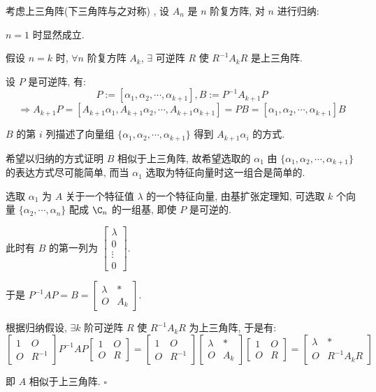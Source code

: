 \documentclass[UTF8]{ctexart}
\DeclareMathOperator{\0}{\mathbf{0}}
\DeclareMathOperator{\<}{\langle}
\renewcommand{\>}{\rangle}
\begin{document}
		\begin{prf} 
		
			考虑上三角阵(下三角阵与之对称) , 设 \(A_n\) 是 \(n\) 阶复方阵, 对 \(n\) 进行归纳: 

			 \(n=1\) 时显然成立. 

			假设 \(n=k\) 时,  \(\forall n\) 阶复方阵 \(A_k\),  \(\exists\) 可逆阵 \(R\) 使 \(R^{-1}A_k R\) 是上三角阵. 
			
			设 \(P\) 是可逆阵, 有: 
			\[P:=[\alpha_1,\alpha_2,\cdots,\alpha_{k+1}], B:=P^{-1}A_{k+1}P\]
			\[\Longrightarrow A_{k+1}P=[A_{k+1}\alpha_1,A_{k+1}\alpha_2,\cdots,A_{k+1}\alpha_{k+1}]=PB=[\alpha_1,\alpha_2,\cdots,\alpha_{k+1}]B\]
			
			 \(B\) 的第 \(i\) 列描述了向量组 \(\{\alpha_1,\alpha_2,\cdots,\alpha_{k+1}\}\)  得到 \(A_{k+1}\alpha_i\) 的方式. 

			希望以归纳的方式证明 \(B\) 相似于上三角阵, 故希望选取的 \(\alpha_1\) 由 \(\{\alpha_1,\alpha_2,\cdots,\alpha_{k+1}\}\)  的表达方式尽可能简单, 而当 \(\alpha_1\) 选取为特征向量时这一组合是简单的. 

			选取 \(\alpha_1\) 为 \(A\) 关于一个特征值 \(\lambda\) 的一个特征向量, 由基扩张定理知, 可选取 \(k\) 个向量 \(\{\alpha_2,\cdots,\alpha_n\}\) 配成 \(\C_n\) 的一组基, 即使 \(P\) 是可逆的. 
			
			此时有 \(B\) 的第一列为
			 \(\begin{bmatrix}
				\lambda\\
				0\\
				\vdots\\
				0
			\end{bmatrix}\). 
			
			于是 \(P^{-1}AP=B=
			\begin{bmatrix}
				\lambda & *\\
				O & A_{k}
			\end{bmatrix}\). 

			根据归纳假设,  \(\exists k\) 阶可逆阵 \(R\) 使 \(R^{-1}A_{k}R\) 为上三角阵, 于是有: 
			\[\begin{bmatrix}
				1 & O\\
				O & R^{-1}
			\end{bmatrix}
			P^{-1}AP
			\begin{bmatrix}
				1 & O\\
				O & R
			\end{bmatrix}=
			\begin{bmatrix}
				1 & O\\
				O & R^{-1}
			\end{bmatrix}
			\begin{bmatrix}
				\lambda & *\\
				O & A_{k}
			\end{bmatrix}
			\begin{bmatrix}
				1 & O\\
				O & R
			\end{bmatrix}=
			\begin{bmatrix}
				\lambda & *\\
				O & R^{-1}A_k R
			\end{bmatrix}\]

			即 \(A\) 相似于上三角阵.  \(\square\) 
		\end{prf}
	
\end{document}
